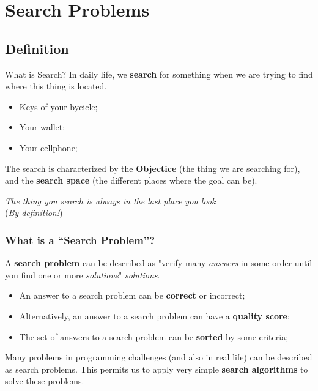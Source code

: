 \section{Search Problems}

\subsection{Definition}
\begin{frame}{What is Search?}
  In daily life, we {\bf search} for something when we are trying to find where this thing is located.\medskip

  \begin{itemize}
  \item Keys of your bycicle;
  \item Your wallet;
  \item Your cellphone;
  \end{itemize}\medskip

  The search is characterized by the {\bf Objectice} (the thing we are searching for), and the {\bf search space} (the different places where the goal can be).

  \begin{block}{}
    {\smaller
    \hfill \emph{The thing you search is always in the last place you look}\\
    \hfill (\emph{By definition!})}
  \end{block}
\end{frame}

\begin{frame}
  \frametitle{What is a ``Search Problem''?}
    A {\bf search problem} can be described as "verify many \emph{answers} in some order until you find one or more \emph{solutions}"
    \emph{solutions}.\bigskip

    \begin{itemize}
      \item An answer to a search problem can be {\bf correct} or \alert{incorrect};\smallskip

      \item Alternatively, an answer to a search problem can have a {\bf quality score};\smallskip

      \item The set of answers to a search problem can be {\bf sorted} by some criteria;
    \end{itemize}
    \bigskip

    Many problems in programming challenges (and also in real life) can be described as search problems. This permits us to apply very simple {\bf search algorithms} to solve these problems.
\end{frame}

